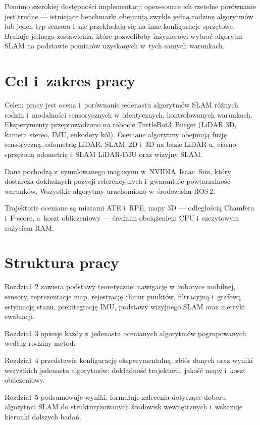 Pomimo szerokiej dostępności implementacji open-source ich rzetelne porównanie
jest trudne --- istniejące benchmarki obejmują zwykle jedną rodzinę algorytmów
lub jeden typ sensora i~nie przekładają się na inne konfiguracje sprzętowe.
Brakuje jednego zestawienia, które pozwoliłoby inżynierowi wybrać algorytm SLAM
na podstawie pomiarów uzyskanych w~tych samych warunkach.

\section{Cel i~zakres pracy}

Celem pracy jest ocena i~porównanie jedenastu algorytmów SLAM różnych rodzin
i~modalności sensorycznych w~identycznych, kontrolowanych warunkach.
Eksperymenty przeprowadzono na robocie TurtleBot3~Burger (LiDAR 3D, kamera stereo,
IMU, enkodery kół).
Oceniane algorytmy obejmują fuzję sensoryczną, odometrię LiDAR, SLAM~2D i~3D
na bazie LiDAR-u, ciasno sprzężoną odometrię i~SLAM LiDAR-IMU oraz wizyjny SLAM.

Dane pochodzą z~symulowanego magazynu w~NVIDIA~Isaac~Sim, który dostarcza
dokładnych pozycji referencyjnych i~gwarantuje powtarzalność warunków.
Wszystkie algorytmy uruchomiono w~środowisku ROS\,2.

Trajektorie oceniane są miarami ATE i~RPE, mapy 3D --- odległością Chamfera
i~F-score, a~koszt obliczeniowy --- średnim obciążeniem CPU i~szczytowym
zużyciem RAM.

\section{Struktura pracy}

\begingroup
\setlength{\parskip}{2pt}
\setlength{\parindent}{1.5em}

Rozdział~2 zawiera podstawy teoretyczne: nawigację w~robotyce mobilnej, sensory,
reprezentacje map, rejestrację chmur punktów, filtracyjną i~grafową estymację
stanu, preintegrację IMU, podstawy wizyjnego SLAM oraz metryki ewaluacji.

Rozdział~3 opisuje każdy z~jedenastu ocenianych algorytmów pogrupowanych
według rodziny metod.

Rozdział~4 przedstawia konfigurację eksperymentalną, zbiór danych oraz wyniki
wszystkich jedenastu algorytmów: dokładność trajektorii, jakość mapy
i~koszt obliczeniowy.

Rozdział~5 podsumowuje wyniki, formułuje zalecenia dotyczące doboru algorytmu SLAM
do strukturyzowanych środowisk wewnętrznych i~wskazuje kierunki dalszych badań.

